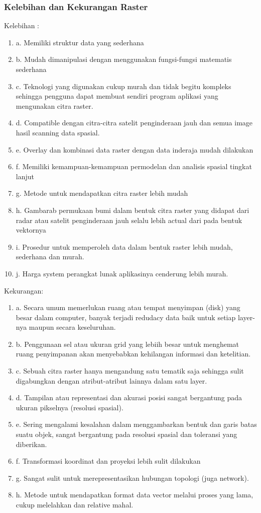 \subsubsection{Kelebihan dan Kekurangan Raster}
 Kelebihan :
 \begin{enumerate}
    \item a. Memiliki struktur data yang sederhana
    \item b. Mudah dimanipulasi dengan menggunakan fungsi-fungsi matematis sederhana
    \item c. Teknologi yang digunakan cukup murah dan tidak begitu kompleks sehingga pengguna dapat 
             membuat sendiri program aplikasi yang mengunakan citra raster.
    \item d. Compatible dengan citra-citra satelit penginderaan jauh dan semua image hasil scanning data spasial.
    \item e. Overlay dan kombinasi data raster dengan data inderaja mudah dilakukan
    \item f. Memiliki kemampuan-kemampuan permodelan dan analisis spasial tingkat lanjut
    \item g. Metode untuk mendapatkan citra raster lebih mudah
    \item h. Gambarab permukaan bumi dalam bentuk citra raster yang didapat dari radar atau satelit 
             penginderaan jauh selalu lebih actual dari pada bentuk vektornya
    \item i. Prosedur untuk memperoleh data dalam bentuk raster lebih mudah, sederhana dan murah.
    \item j. Harga system perangkat lunak aplikasinya cenderung lebih murah.
 \end{enumerate}
 Kekurangan:
 \begin{enumerate}
    \item a. Secara umum memerlukan ruang atau tempat menyimpan (disk) yang besar dalam computer, 
             banyak terjadi redudacy data baik untuk setiap layer-nya maupun secara keseluruhan.
    \item b. Penggunaan sel atau ukuran grid yang lebiih besar untuk menghemat ruang penyimpanan akan 
             menyebabkan kehilangan informasi dan ketelitian.
    \item c. Sebuah citra raster hanya mengandung satu tematik saja sehingga sulit digabungkan 
             dengan atribut-atribut lainnya dalam satu layer.
    \item d. Tampilan atau representasi dan akurasi posisi sangat bergantung pada ukuran pikselnya (resolusi spasial).
    \item e. Sering mengalami kesalahan dalam menggambarkan bentuk dan garis batas suatu objek, 
             sangat bergantung pada resolusi spasial dan toleransi yang diberikan.
    \item f. Transformasi koordinat dan proyeksi lebih sulit dilakukan
    \item g. Sangat sulit untuk merepresentasikan hubungan topologi (juga network).
    \item h. Metode untuk mendapatkan format data vector melalui proses yang lama, cukup melelahkan dan relative mahal.
  \end{enumerate}
 
 
